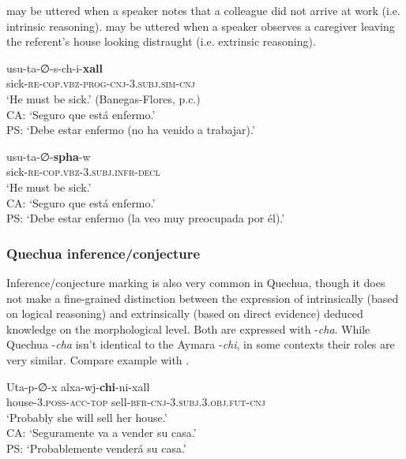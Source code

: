 \documentclass[output=paper,hidelinks]{langscibook}
\begin{document}
  may be uttered when a speaker notes that a colleague did not arrive at work (i.e. intrinsic reasoning).  may be uttered when a speaker observes a caregiver leaving the referent's house looking distraught (i.e. extrinsic reasoning).



\ea \label{ex:jalla1}
\gll usu-ta-∅-s-ch-i-\textbf{xall} \\
sick-\textsc{re-cop.vbz-prog-cnj-3.subj.sim-cnj} \\ 
\glt ‘He must be sick.’ (Banegas-Flores, p.c.) \\
CA: ‘Seguro que está enfermo.’ \\
PS: `Debe estar enfermo (no ha venido a trabajar).'
\z

\ea \label{ex:jalla2}
\gll usu-ta-∅-\textbf{spha}-w \\
sick-\textsc{re-cop.vbz-3.subj.infr-decl} \\ 
\glt ‘He must be sick.’ \citep[564]{coler2014grammar} \\
CA: ‘Seguro que está enfermo.’ \\
PS: `Debe estar enfermo (la veo muy preocupada por él).'
\z


\subsubsection{Quechua inference/conjecture}
Inference/conjecture marking is also very common in Quechua, though it does not make a fine-grained distinction between the expression of intrinsically (based on logical reasoning) and extrinsically (based on direct evidence) deduced knowledge on the morphological level. Both are expressed with -\textit{cha}. While Quechua -\textit{cha} isn't identical to the Aymara -\textit{chi}, in some contexts their roles are very similar. Compare example  with .

\ea \label{ex:Aym-Compare}
\gll Uta-p-∅-x		alxa-wj-\textbf{chi}-ni-xall \\
house-\textsc{3.poss-acc-top} sell-\textsc{bfr-cnj-3.subj.3.obj.fut-cnj} \\ 
\glt `Probably she will sell her house.' \\
CA: `Seguramente va a vender su casa.'\\
PS: `Probablemente venderá su casa.'
\z
\end{document}
